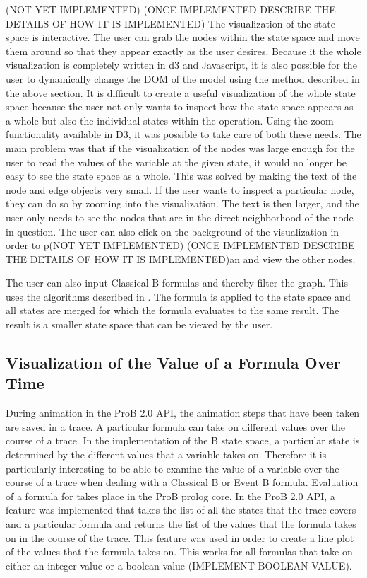 (NOT YET IMPLEMENTED)
(ONCE IMPLEMENTED DESCRIBE THE DETAILS OF HOW IT IS IMPLEMENTED)
The visualization of the state space is interactive. The user can grab the nodes within the state space and move them around so that they appear exactly as the user desires. Because it the whole visualization is completely written in d3 and Javascript, it is also possible for the user to dynamically change the DOM of the model using the method described in the above section. It is difficult to create a useful visualization of the whole state space because the user not only wants to inspect how the state space appears as a whole but also the individual states within the operation. Using the zoom functionality available in D3, it was possible to take care of both these needs. The main problem was that if the visualization of the nodes was large enough for the user to read the values of the variable at the given state, it would no longer be easy to see the state space as a whole. This was solved by making the text of the node and edge objects very small. If the user wants to inspect a particular node, they can do so by zooming into the visualization. The text is then larger, and the user only needs to see the nodes that are in the direct neighborhood of the node in question. The user can also click on the background of the visualization in order to p(NOT YET IMPLEMENTED)
(ONCE IMPLEMENTED DESCRIBE THE DETAILS OF HOW IT IS IMPLEMENTED)an and view the other nodes. 

The user can also input Classical B formulas and thereby filter the graph. This uses the algorithms described in \cite{LeTu05_8}. The formula is applied to the state space and all states are merged for which the formula evaluates to the same result. The result is a smaller state space that can be viewed by the user.

\subsection{Visualization of the Value of a Formula Over Time}

During animation in the ProB 2.0 API, the animation steps that have been taken are saved in a trace. A particular formula can take on different values over the course of a trace. In the implementation of the B state space, a particular state is determined by the different values that a variable takes on. Therefore it is particularly interesting to be able to examine the value of a variable over the course of a trace when dealing with a Classical B or Event B formula. 
Evaluation of a formula for takes place in the ProB prolog core. In the ProB 2.0 API, a feature was implemented that takes the list of all the states that the trace covers and a particular formula and returns the list of the values that the formula takes on in the course of the trace. This feature was used in order to create a line plot of the values that the formula takes on. This works for all formulas that take on either an integer value or a boolean value (IMPLEMENT BOOLEAN VALUE).

